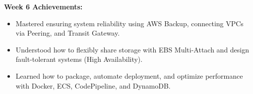 \vspace{0.5em}\noindent\textbf{Week 6 Achievements:}\par

\begin{itemize}
\tightlist
\item
  Mastered ensuring system reliability using AWS Backup, connecting VPCs
  via Peering, and Transit Gateway.
\item
  Understood how to flexibly share storage with EBS Multi-Attach and
  design fault-tolerant systems (High Availability).
\item
  Learned how to package, automate deployment, and optimize performance
  with Docker, ECS, CodePipeline, and DynamoDB.
\end{itemize}
